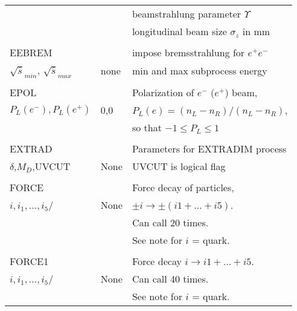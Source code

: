 \begin{center}
\begin{tabular}{lll}
                       & & beamstrahlung parameter $\Upsilon$ \\
                       & & longitudinal beam size $\sigma_z$ in mm \\
                       &                   &                                \\
EEBREM                 &                 & impose bremsstrahlung for $e^+e^-$ \\
$\sqrt{\hat{s}}_{min}$, $\sqrt{\hat{s}}_{max}$ & none & min and max subprocess 
energy \\
                       &                   &                                \\
EPOL                   &              & Polarization of $e^-$ ($e^+$) beam, \\
$P_L(e^-),P_L(e^+)$    & 0,0               & $P_L(e)=(n_L-n_R)/(n_L-n_R)$,  \\
                       &                   & so that $-1 \le P_L \le 1$     \\
                       &                   &                                \\
EXTRAD                 &                   & Parameters for EXTRADIM process\\
$\delta$,$M_D$,UVCUT   & None              & UVCUT is logical flag          \\
                       &                   &                                \\
FORCE                  &                   & Force decay of particles,      \\
$i,i_1,...,i_5$/       & None              & $\pm i \to \pm(i1+...+i5)$.    \\
                       &                   & Can call 20 times.             \\
                       &                   & See note for $i$ = quark.      \\
                       &                   &                                \\
FORCE1                 &                   & Force decay $i \to i1+...+i5$. \\
$i,i_1,...,i_5$/       & None              & Can call 40 times.             \\
                       &                   & See note for $i$ = quark.      \\
\hline\hline
\end{tabular}
\end{center}

